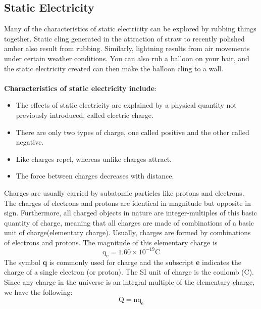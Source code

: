 \documentclass[9pt]{article}
\begin{document}
	\subsection*{Static Electricity}
	Many of the characteristics of static electricity can be explored by rubbing things together. Static cling generated in the attraction of straw to recently polished amber also result from rubbing. Similarly, lightning results from air movements under certain weather conditions. You can also rub a balloon on your hair, and the static electricity created can then make the balloon cling to a wall. \\ \\
	\textbf{Characteristics of static electricity include}:
	\begin{itemize}
		\item The effects of static electricity are explained by a physical quantity not previously introduced, called electric charge.
		\item There are only two types of charge, one called positive and the other called negative.
		\item Like charges repel, whereas unlike charges attract.
		\item The force between charges decreases with distance.
	\end{itemize}
	Charges are usually carried by subatomic particles like protons and electrons. The charges of electrons and protons are identical in magnitude but opposite in sign. Furthermore, all charged objects in nature are integer-multiples of this basic quantity of charge, meaning that all charges are made of combinations of a basic unit of charge(elementary charge). Usually, charges are formed by combinations of electrons and protons. The magnitude of this elementary charge is
	$$\text{q}_\text{e}=1.60\times10^{-19}\text{C}$$ The symbol \textbf{q} is commonly used for charge and the subscript \textbf{e} indicates the charge of a single electron (or proton).
	The SI unit of charge is the coulomb (C). Since any charge in the universe is an integral multiple of the elementary charge, we have the following:
	$$\text{Q}=\text{nq}_\text{e}$$
\end{document}
